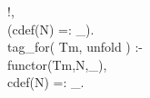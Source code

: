 \documentclass[11pt]{report}
\begin{document}
\begin{sf}
\begin{tabbing}
\hspace{2em}!,\\[-0.15ex]
\hspace{2em}(cdef(N) =: \_\hspace{0.1em}).\\[-0.15ex]
tag\_\hspace{0.1em}for( Tm, unfold ) :-\\[-0.15ex]
\hspace{2em}functor(Tm,N,\_\hspace{0.1em}),\\[-0.15ex]
\hspace{2em}cdef(N) =: \_\hspace{0.1em}.\\[-0.7ex]

\end{tabbing}\end{sf}
\end{document}
